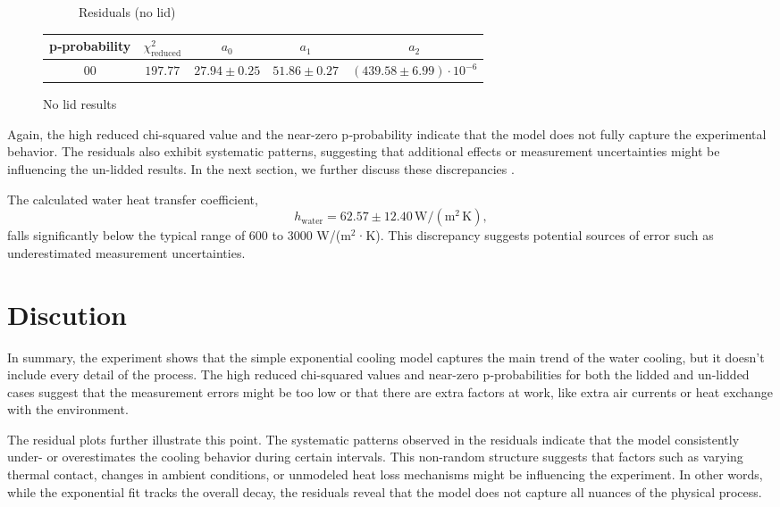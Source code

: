 \documentclass[12pt,a4paper]{report}
\begin{document}
\begin{figure}[htbp]
\begin{subfigure}[b]{0.48\textwidth}
      \caption{Residuals (no lid)}
      \label{fig:no lid residual}
    \end{subfigure}
    \caption{No lid results}
\vspace{1em}
\begin{tabular}{ccccc}
\toprule
p‑probability & $\chi^2_{\mathrm{reduced}}$ & $a_0$ & $a_1$ & $a_2$ \\
\midrule
 00 & $197.77$ & $27.94 \pm 0.25$ & $51.86 \pm 0.27$ & $(439.58 \pm 6.99) \cdot 10^{-6}$ \\
\bottomrule
\end{tabular}
    \label{fig:results no lid}
\end{figure}

Again, the high reduced chi-squared value and the near-zero p‑probability indicate that the model does not fully capture the experimental behavior. The residuals also exhibit systematic patterns, suggesting that additional effects or measurement uncertainties might be influencing the un-lidded results. In the next section, we further discuss these discrepancies
.

The calculated water heat transfer coefficient,
\[
h_{\mathrm{water}} = 62.57 \pm 12.40\,\mathrm{W/(m^2\,K)},
\]
falls significantly below the typical range of 600 to 3000 W/(m\(^2\)·K). This discrepancy suggests potential sources of error such as underestimated measurement uncertainties.

\section{Discution}
In summary, the experiment shows that the simple exponential cooling model captures the main trend of the water cooling, but it doesn’t include every detail of the process. The high reduced chi-squared values and near-zero p‑probabilities for both the lidded and un-lidded cases suggest that the measurement errors might be too low or that there are extra factors at work, like extra air currents or heat exchange with the environment.

The residual plots further illustrate this point. The systematic patterns observed in the residuals indicate that the model consistently under- or overestimates the cooling behavior during certain intervals. This non-random structure suggests that factors such as varying thermal contact, changes in ambient conditions, or unmodeled heat loss mechanisms might be influencing the experiment. In other words, while the exponential fit tracks the overall decay, the residuals reveal that the model does not capture all nuances of the physical process.
\end{document}

